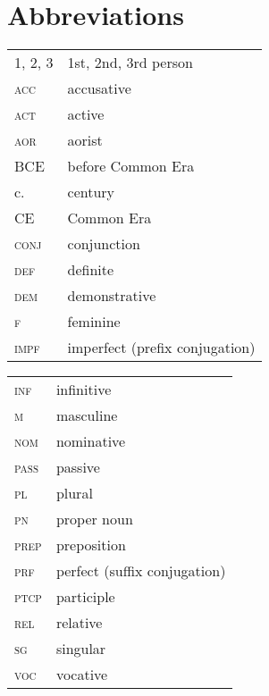 \documentclass[output=paper]{langsci/langscibook}
\begin{document}
\section*{Abbreviations}

\begin{tabularx}{.55\textwidth}{@{}lQ@{}}
\textsc{1, 2, 3} & 1st, 2nd, 3rd person \\
\textsc{acc} & accusative \\
\textsc{act} & active \\
\textsc{aor} & aorist \\
BCE & before Common Era \\
c. & century \\
CE & Common Era \\
\textsc{conj} & conjunction \\
\textsc{def} & {definite} \\
\textsc{dem} & demonstrative \\
\textsc{f} & feminine \\
\textsc{impf} & imperfect (prefix conjugation) \\
\end{tabularx}%
\begin{tabularx}{.5\textwidth}{@{}lQ@{}}
\textsc{inf} & {infinitive} \\
\textsc{m} & masculine \\
\textsc{nom} & nominative \\
\textsc{pass} & {passive} \\
\textsc{pl} & plural \\
\textsc{pn} & proper noun \\
\textsc{prep} & {preposition} \\
\textsc{prf} & perfect (suffix conjugation) \\
\textsc{ptcp} & {participle} \\
\textsc{rel} & {relative} \\
\textsc{sg} & singular \\
\textsc{voc} & {vocative} \\
\end{tabularx}%


\sloppy
\printbibliography[heading=subbibliography,notkeyword=this] 
\end{document}
